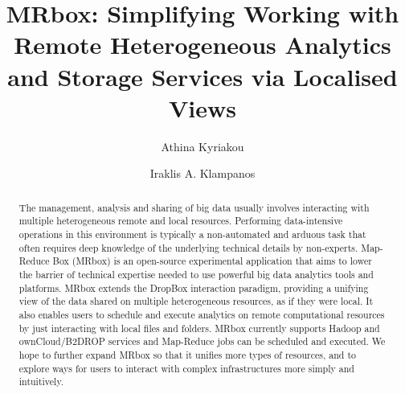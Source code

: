 \documentclass[sigconf,edbt]{acmart-edbt2021}
\begin{document}
\title{MRbox: Simplifying Working with Remote Heterogeneous Analytics and Storage Services via Localised Views}

\author{Athina Kyriakou}

\author{Iraklis A. Klampanos}

\begin{abstract}
The management, analysis and sharing of big data usually involves interacting with multiple heterogeneous remote and local resources. Performing data-intensive operations in this environment is typically a non-automated and arduous task that often requires deep knowledge of the underlying technical details by non-experts. Map-Reduce Box (MRbox) is an open-source experimental application that aims to lower the barrier of technical expertise needed to use powerful big data analytics tools and platforms. MRbox extends the DropBox interaction paradigm, providing a unifying view of the data shared on multiple heterogeneous resources, as if they were local. It also enables users to schedule and execute analytics on remote computational resources by just interacting with local files and folders. MRbox currently supports Hadoop and ownCloud/B2DROP services and Map-Reduce jobs can be scheduled and executed. We hope to further expand MRbox so that it unifies more types of resources, and to explore ways for users to interact with complex infrastructures more simply and intuitively.
\end{abstract}

\maketitle





\end{document}

